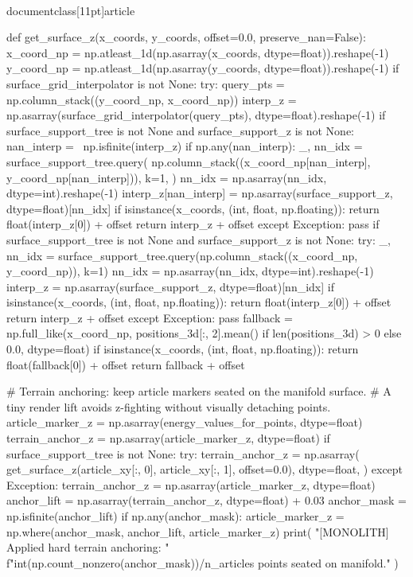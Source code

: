 \\documentclass[11pt]{article}
\begin{document}
\begin{CodeBlock}
{{{{{    def get_surface_z(x_coords, y_coords, offset=0.0, preserve_nan=False):
        x_coord_np = np.atleast_1d(np.asarray(x_coords, dtype=float)).reshape(-1)
        y_coord_np = np.atleast_1d(np.asarray(y_coords, dtype=float)).reshape(-1)
        if surface_grid_interpolator is not None:
            try:
                query_pts = np.column_stack((y_coord_np, x_coord_np))
                interp_z = np.asarray(surface_grid_interpolator(query_pts), dtype=float).reshape(-1)
                if surface_support_tree is not None and surface_support_z is not None:
                    nan_interp = ~np.isfinite(interp_z)
                    if np.any(nan_interp):
                        _, nn_idx = surface_support_tree.query(
                            np.column_stack((x_coord_np[nan_interp], y_coord_np[nan_interp])),
                            k=1,
                        )
                        nn_idx = np.asarray(nn_idx, dtype=int).reshape(-1)
                        interp_z[nan_interp] = np.asarray(surface_support_z, dtype=float)[nn_idx]
                if isinstance(x_coords, (int, float, np.floating)):
                    return float(interp_z[0]) + offset
                return interp_z + offset
            except Exception:
                pass
        if surface_support_tree is not None and surface_support_z is not None:
            try:
                _, nn_idx = surface_support_tree.query(np.column_stack((x_coord_np, y_coord_np)), k=1)
                nn_idx = np.asarray(nn_idx, dtype=int).reshape(-1)
                interp_z = np.asarray(surface_support_z, dtype=float)[nn_idx]
                if isinstance(x_coords, (int, float, np.floating)):
                    return float(interp_z[0]) + offset
                return interp_z + offset
            except Exception:
                pass
        fallback = np.full_like(x_coord_np, positions_3d[:, 2].mean() if len(positions_3d) > 0 else 0.0, dtype=float)
        if isinstance(x_coords, (int, float, np.floating)):
            return float(fallback[0]) + offset
        return fallback + offset

    # Terrain anchoring: keep article markers seated on the manifold surface.
    # A tiny render lift avoids z-fighting without visually detaching points.
    article_marker_z = np.asarray(energy_values_for_points, dtype=float)
    terrain_anchor_z = np.asarray(article_marker_z, dtype=float)
    if surface_support_tree is not None:
        try:
            terrain_anchor_z = np.asarray(
                get_surface_z(article_xy[:, 0], article_xy[:, 1], offset=0.0),
                dtype=float,
            )
        except Exception:
            terrain_anchor_z = np.asarray(article_marker_z, dtype=float)
    anchor_lift = np.asarray(terrain_anchor_z, dtype=float) + 0.03
    anchor_mask = np.isfinite(anchor_lift)
    if np.any(anchor_mask):
        article_marker_z = np.where(anchor_mask, anchor_lift, article_marker_z)
        print(
            "[MONOLITH] Applied hard terrain anchoring: "
            f"{int(np.count_nonzero(anchor_mask))}/{n_articles} points seated on manifold."
        )


}}}}}
\end{CodeBlock}
\end{document}
